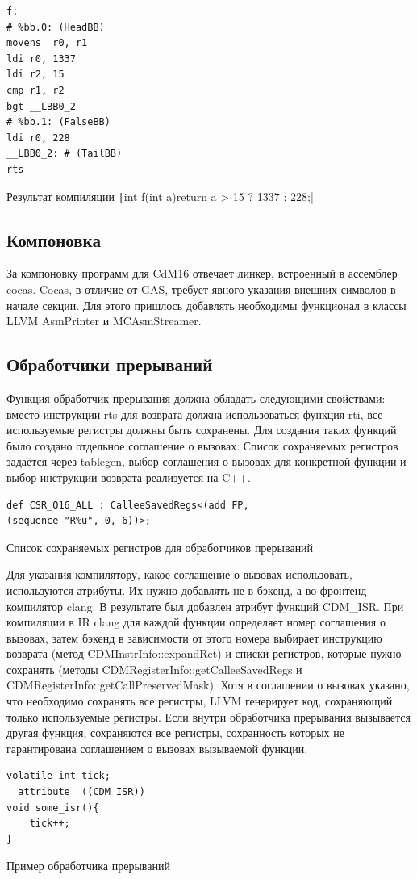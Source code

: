 \documentclass[a4paper,14pt]{extarticle}
\begin{document}
\begin{listing}[h!]
\begin{verbatim}
f:
# %bb.0: (HeadBB)
movens	r0, r1
ldi	r0, 1337
ldi	r2, 15
cmp	r1, r2
bgt	__LBB0_2
# %bb.1: (FalseBB)
ldi	r0, 228
__LBB0_2: # (TailBB)
rts
\end{verbatim}
\caption{Результат компиляции \texttt|int f(int a){return a > 15 ? 1337 : 228;}| }
\end{listing}

\subsection{Компоновка} 
За компоновку программ для CdM16 отвечает линкер, встроенный в ассемблер cocas.  Cocas, в отличие от GAS, требует явного указания внешних символов в начале секции. Для этого пришлось добавлять необходимы  функционал в классы LLVM AsmPrinter и MCAsmStreamer.

\subsection{Обработчики прерываний}
Функция-обработчик прерывания должна обладать следующими свойствами: вместо инструкции rts для возврата должна использоваться функция rti, все используемые регистры должны быть сохранены. Для создания таких функций было создано отдельное соглашение о вызовах. Список сохраняемых регистров задаётся через tablegen, выбор соглашения о вызовах для конкретной функции и выбор инструкции возврата реализуется на C++.
\begin{listing}[h!]
	\begin{verbatim}
def CSR_O16_ALL : CalleeSavedRegs<(add FP,
(sequence "R%u", 0, 6))>;
	\end{verbatim}
	\caption{Список сохраняемых регистров для обработчиков прерываний}
\end{listing}

Для указания компилятору, какое соглашение о вызовах использовать, используются атрибуты. Их нужно добавлять не в бэкенд, а во фронтенд - компилятор clang. В результате был добавлен атрибут функций CDM\_ISR. При компиляции в IR clang для каждой функции определяет номер соглашения о вызовах, затем бэкенд в зависимости от этого номера выбирает инструкцию возврата (метод CDMInstrInfo::expandRet) и списки регистров, которые нужно сохранять (методы CDMRegisterInfo::getCalleeSavedRegs и CDMRegisterInfo::getCallPreservedMask). Хотя в соглашении о вызовах указано, что необходимо сохранять все регистры, LLVM генерирует код, сохраняющий только используемые регистры. Если внутри обработчика прерывания вызывается другая функция, сохраняются все регистры, сохранность которых не гарантирована соглашением о вызовах вызываемой функции.
\begin{listing}[h!]
	\begin{verbatim}
volatile int tick;
__attribute__((CDM_ISR))
void some_isr(){
	tick++;
}
	\end{verbatim}
	\caption{Пример обработчика прерываний}
\end{listing}
\end{document}
